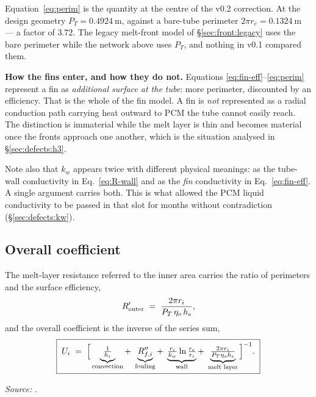 Equation~\eqref{eq:perim} is the quantity at the centre of the v0.2 correction.
At the design geometry $P_{T}=\SI{0.4924}{\meter}$, against a bare-tube
perimeter $2\pi r_{e}=\SI{0.1324}{\meter}$ --- a factor of $3.72$. The legacy
melt-front model of \S\ref{sec:front:legacy} uses the bare perimeter while the
network above uses $P_{T}$, and nothing in v0.1 compared them.

\medskip
\noindent\textbf{How the fins enter, and how they do not.} Equations
\eqref{eq:fin-eff}--\eqref{eq:perim} represent a fin as \emph{additional surface
at the tube}: more perimeter, discounted by an efficiency. That is the whole of
the fin model. A fin is \emph{not} represented as a radial conduction path
carrying heat outward to PCM the tube cannot easily reach. The distinction is
immaterial while the melt layer is thin and becomes material once the fronts
approach one another, which is the situation analysed in
\S\ref{sec:defects:h3}.

Note also that $k_{w}$ appears twice with different physical meanings: as the
tube-wall conductivity in Eq.~\eqref{eq:R-wall} and as the \emph{fin}
conductivity in Eq.~\eqref{eq:fin-eff}. A single argument carries both. This is
what allowed the PCM liquid conductivity to be passed in that slot for months
without contradiction (\S\ref{sec:defects:kw}).

\subsection{Overall coefficient}

The melt-layer resistance referred to the inner area carries the ratio of
perimeters and the surface efficiency,
\begin{equation}
  R'_{\mathrm{outer}} \;=\; \frac{2\pi r_{i}}{P_{T}\,\eta_{o}\,h_{e}},
  \label{eq:R-outer}
\end{equation}
and the overall coefficient is the inverse of the series sum,
\begin{equation}
  \boxed{\;
  U_{i} \;=\;
  \Bigl[\,
    \underbrace{\tfrac{1}{h_{i}}}_{\text{convection}}
    +\;\underbrace{R''_{f,i}}_{\text{fouling}}
    +\;\underbrace{\tfrac{r_{i}}{k_{w}}\ln\tfrac{r_{e}}{r_{i}}}_{\text{wall}}
    +\;\underbrace{\tfrac{2\pi r_{i}}{P_{T}\eta_{o} h_{e}}}_{\text{melt layer}}
  \,\Bigr]^{-1} .
  \;}
  \label{eq:Ui}
\end{equation}

\emph{Source:} .

